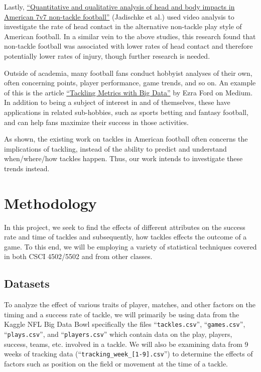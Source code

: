 \documentclass[bibtex, sigconf, hyperref={colorlinks=true,linkcolor=blue,urlcolor=blue}]{acmart}
\begin{document}
Lastly,
\href{https://bmjopensem.bmj.com/content/6/1/e000638.abstract}{“Quantitative and
qualitative analysis of head and body impacts in American 7v7 non-tackle
football”}\cite{quantitative} (Jadischke et al.) used video analysis to
investigate the rate of head contact in the alternative non-tackle play style of
American football. In a similar vein to the above studies, this research found
that non-tackle football was associated with lower rates of head contact and
therefore potentially lower rates of injury, though further research is needed.

Outside of academia, many football fans conduct hobbyist analyses of their own,
often concerning points, player performance, game trends, and so on. An example
of this is the article
\href{https://medium.com/@ezra.ford/tackling-metrics-with-big-data-0812b5ab65f0}{“Tackling
Metrics with Big Data”}\cite{mediummetrics} by Ezra Ford on Medium. In addition to being a subject
of interest in and of themselves, these have applications in related
sub-hobbies, such as sports betting and fantasy football, and can help fans
maximize their success in those activities.

As shown, the existing work on tackles in American football often concerns the
implications of tackling, instead of the ability to predict and understand
when/where/how tackles happen.  Thus, our work intends to investigate these
trends instead.

\section{Methodology}

In this project, we seek to find the effects of different attributes on the
success rate and time of tackles and subsequently, how tackles effects the
outcome of a game.  To this end, we will be employing a variety of statistical
techniques covered in both CSCI 4502/5502 and from other classes.

\subsection{Datasets}

To analyze the effect of various traits of player, matches, and other factors
on the timing and a success rate of tackle, we will primarily be using data
from the Kaggle NFL Big Data Bowl \cite{nflkaggle}
specifically the files ``\verb|tackles.csv|'', ``\verb|games.csv|'',
``\verb|plays.csv|'', and ``\verb|players.csv|'' which contain data on the play,
players, success, teams, etc. involved in a tackle.  We will also be examining data from 9 weeks of
tracking data (``\verb|tracking_week_[1-9].csv|'') to determine the effects of
factors such as position on the field or movement at the time of a tackle.
\end{document}
